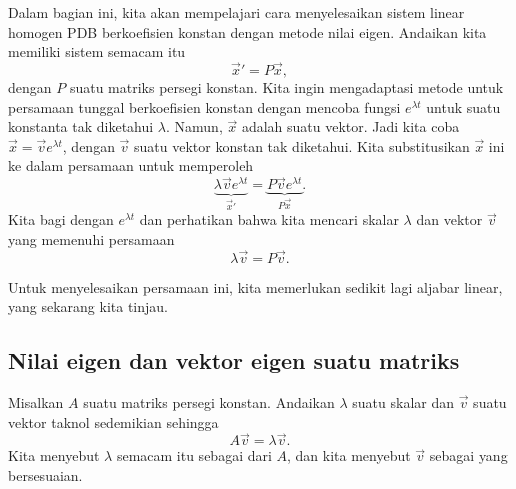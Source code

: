 Dalam bagian ini, kita akan mempelajari cara menyelesaikan sistem linear homogen
PDB berkoefisien konstan dengan metode nilai eigen.
Andaikan kita memiliki sistem semacam itu
\begin{equation*}
{\vec{x}}' = P\vec{x} ,
\end{equation*}
dengan
$P$ suatu
matriks persegi konstan.
Kita ingin
mengadaptasi metode untuk persamaan tunggal
berkoefisien konstan dengan mencoba fungsi $e^{\lambda t}$
untuk suatu konstanta tak diketahui $\lambda$.
Namun, $\vec{x}$ adalah suatu vektor.  Jadi kita coba $\vec{x} = \vec{v} e^{\lambda t}$, dengan
$\vec{v}$ suatu vektor konstan tak diketahui.  Kita substitusikan $\vec{x}$ ini ke dalam persamaan untuk memperoleh
\begin{equation*}
\underbrace{\lambda \vec{v} e^{\lambda t}}_{{\vec{x}}'} =
\underbrace{P\vec{v} e^{\lambda t}}_{P\vec{x}} .
\end{equation*}
Kita bagi dengan $e^{\lambda t}$ dan perhatikan bahwa kita mencari skalar $\lambda$
dan vektor $\vec{v}$ yang memenuhi persamaan
\begin{equation*}
\lambda \vec{v} = P\vec{v} .
\end{equation*}

Untuk menyelesaikan persamaan ini, kita memerlukan sedikit lagi aljabar linear, yang sekarang
kita tinjau.

\subsection{Nilai eigen dan vektor eigen suatu matriks}

Misalkan $A$ suatu matriks persegi konstan.  Andaikan
$\lambda$ suatu skalar dan
$\vec{v}$ suatu vektor taknol sedemikian sehingga
\begin{equation*}
A \vec{v} = \lambda \vec{v}.
\end{equation*}
Kita menyebut $\lambda$ semacam itu sebagai \emph{} dari $A$,
dan kita
menyebut $\vec{v}$
sebagai \emph{} yang bersesuaian.

